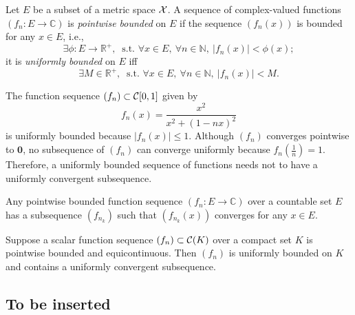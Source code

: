 \begin{defn}
  \label{eq:uniformlyBounded}
  Let $E$ be a subset of a metric space ${\cal X}$.
  A sequence of complex-valued functions $(f_n: E\rightarrow\mathbb{C})$  
  is \emph{pointwise bounded} on $E$
  if the sequence $(f_n(x))$ is bounded for any $x\in E$, i.e.,
  \begin{equation}
    \label{eq:pointwiseBounded}
    \exists \phi:E\rightarrow\mathbb{R}^+,\ \text{ s.t. } \forall x\in E,\
    \forall n\in\mathbb{N},\ |f_n(x)|<\phi(x);
  \end{equation}
  it is \emph{uniformly bounded} on $E$ iff
  \begin{equation}
    \label{eq:uniformlyBounded}
    \exists M\in \mathbb{R}^+,\ \text{ s.t. } \forall x\in E,\
    \forall n\in\mathbb{N},\ |f_n(x)|<M.
  \end{equation}
\end{defn}

\begin{exm}
  The function sequence $(f_n)\subset {\cal C}[0,1]$ given by
  \begin{displaymath}
    f_n(x)=\frac{x^2}{x^2+(1-nx)^2}
  \end{displaymath}
  is uniformly bounded because $|f_n(x)|\le 1$.
  Although $(f_n)$ converges pointwise to $\mathbf{0}$,
   no subsequence of $(f_n)$ can converge uniformly
   because $f_n(\frac{1}{n})=1$.
  Therefore, a uniformly bounded sequence of functions
   needs not to have a uniformly convergent subsequence.
\end{exm}

\begin{lem}
  \label{lem:pointwiseBoundedOnCountableSet}
  Any pointwise bounded function sequence $(f_n: E\rightarrow \mathbb{C})$
  over a countable set $E$ 
  has a subsequence $(f_{n_k})$
  such that $(f_{n_k}(x))$ converges for any $x\in E$. 
\end{lem}

\begin{thm}%
  \label{thm:AscoliSequence}
  Suppose a scalar function sequence $(f_n)\subset {\cal C}(K)$
  over a compact set $K$ is pointwise bounded and equicontinuous.
  Then $(f_n)$ is uniformly bounded on $K$
  and contains a uniformly convergent subsequence.
\end{thm}



\subsection{To be inserted}

